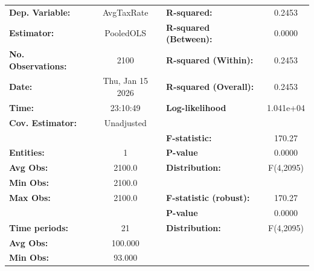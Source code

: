 \begin{center}
\begin{tabular}{lclc}
\toprule
\textbf{Dep. Variable:}                           &     AvgTaxRate     & \textbf{  R-squared:         }   &      0.2453      \\
\textbf{Estimator:}                               &     PooledOLS      & \textbf{  R-squared (Between):}  &      0.0000      \\
\textbf{No. Observations:}                        &        2100        & \textbf{  R-squared (Within):}   &      0.2453      \\
\textbf{Date:}                                    &  Thu, Jan 15 2026  & \textbf{  R-squared (Overall):}  &      0.2453      \\
\textbf{Time:}                                    &      23:10:49      & \textbf{  Log-likelihood     }   &    1.041e+04     \\
\textbf{Cov. Estimator:}                          &     Unadjusted     & \textbf{                     }   &                  \\
\textbf{}                                         &                    & \textbf{  F-statistic:       }   &      170.27      \\
\textbf{Entities:}                                &         1          & \textbf{  P-value            }   &      0.0000      \\
\textbf{Avg Obs:}                                 &       2100.0       & \textbf{  Distribution:      }   &    F(4,2095)     \\
\textbf{Min Obs:}                                 &       2100.0       & \textbf{                     }   &                  \\
\textbf{Max Obs:}                                 &       2100.0       & \textbf{  F-statistic (robust):} &      170.27      \\
\textbf{}                                         &                    & \textbf{  P-value            }   &      0.0000      \\
\textbf{Time periods:}                            &         21         & \textbf{  Distribution:      }   &    F(4,2095)     \\
\textbf{Avg Obs:}                                 &      100.000       & \textbf{                     }   &                  \\
\textbf{Min Obs:}                                 &       93.000       & \textbf{                     }   &                  \\

\end{tabular}
\end{center}
